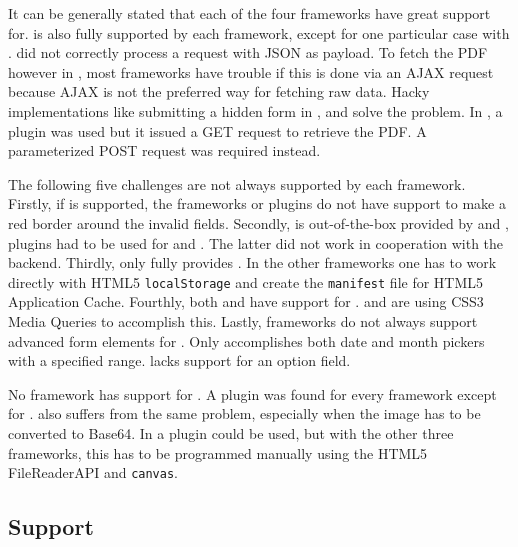\documentclass[a4paper]{artikel3}
\newcommand{\code}[1]{\texttt{#1}}
\begin{document}
It can be generally stated that each of the four frameworks have great support for.
 is also fully supported by each framework, except for one particular case with \lungo{}.
\quo{} did not correctly process a request with JSON as payload.
To fetch the PDF however in , most frameworks have trouble if this is done via an AJAX request because AJAX is not the preferred way for fetching raw data.
Hacky implementations like submitting a hidden form in \jqma{}, \kendoa{} and \lungo{} solve the problem.
In \sta{}, a plugin was used but it issued a GET request to retrieve the PDF.
A parameterized POST request was required instead.

The following five challenges are not always supported by each framework.
Firstly, if  is supported, the frameworks or plugins do not have support to make a red border around the invalid fields.
Secondly,  is out-of-the-box provided by \kendoa{} and \jqma{}, plugins had to be used for \lungo{} and \sta{}.
The latter did not work in cooperation with the backend.
Thirdly, only \sta{} fully provides .
In the other frameworks one has to work directly with HTML5 \code{localStorage} and create the \code{manifest} file for HTML5 Application Cache.
Fourthly, both \sta{} and \kendoa{} have support for .
\jqma{} and \lungo{} are using CSS3 Media Queries to accomplish this.
Lastly, frameworks do not always support advanced form elements for .
Only \kendoa{} accomplishes both date and month pickers with a specified range.  
\lungo{} lacks support for an option field.

No framework has support for .
A plugin was found for every framework except for \lungo{}.
 also suffers from the same problem, especially when the image has to be converted to Base64.
In \sta{} a plugin could be used, but with the other three frameworks, this has to be programmed manually using the HTML5 FileReaderAPI and \code{canvas}. 


\subsection{Support} %
\label{sec:evaluation-support}
\end{document}
